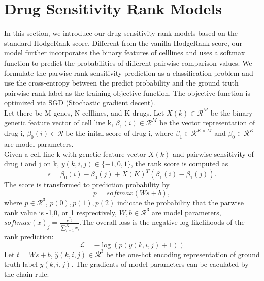 \section{Drug Sensitivity Rank Models}
In this section, we introduce our drug sensitivity rank models based on the standard HodgeRank score. Different from the vanilla HodgeRank score, our model further incorporates the binary features of celllines and uses a softmax function to predict the probabilities of different pairwise comparison values. We formulate the parwise rank sensitivity prediction as a classification problem and use the cross-entropy between the predict probability and the ground truth pairwise rank label as the training objective function. The objective function is optimized via SGD (Stochastic gradient decent). \\
Let there be M genes, N celllines, and K drugs. Let $X(k) \in \mathcal{R}^M$ be the binary genetic feature vector of cell line k, $\beta_1(i) \in \mathcal{R}^M$ be the vector representation of drug i, $\beta_0(i) \in \mathcal{R}$ be the inital score of drug i, where $\beta_1 \in \mathcal{R}^{K \times M}$ and  $\beta_0 \in \mathcal{R} ^{K}$ are  model parameters.
\\ 
Given a cell line k with genetic feature vector $X(k)$ and pairwise sensitivity of drug i and j on k, $y(k,i,j) \in \{-1, 0, 1\}$, the rank score is computed as 
\begin{equation}
s = \beta_0(i) - \beta_0(j) + X(K)^T (\beta_1(i) - \beta_1(j)).
\end{equation}
The score is transformed to prediction probability by 
\begin{equation}
p = softmax(Ws + b),
\end{equation}
where $p \in \mathcal{R}^3$, $p(0), p(1), p(2)$ indicate the probability that the parwise rank value is -1,0, or 1 resprectively, $W,b \in \mathcal{R}^3$ are model parameters, $softmax(x)_j = \frac{e^{x_j}}{\sum_{i=1}^K x_i}$.The overall loss is the negative log-likelihoods of  the rank prediction:
\begin{equation}
\mathcal{L} = - \log (p (y(k,i,j) + 1))
\end{equation}
Let $t = Ws + b$, $\hat{y}(k,i,j)\in \mathcal{R}^3$ be the one-hot encoding representation of ground truth label $y(k,i,j)$. The gradients of model parameters can be caculated by the chain rule:
